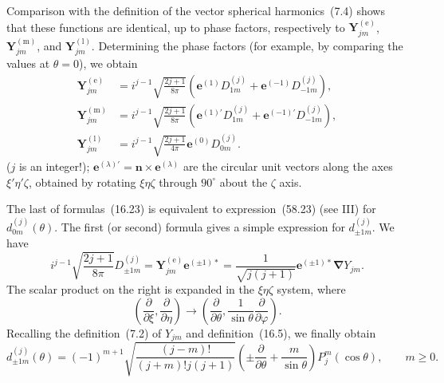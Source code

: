 Comparison with the definition of the vector spherical harmonics~(7.4) shows that these functions are identical, up to phase factors, respectively to $\mathbf Y^{(\text{e})}_{jm}$, $\mathbf Y^{(\text{m})}_{jm}$, and $\mathbf Y^{(\text{l})}_{jm}$. Determining the phase factors (for example, by comparing the values at $\theta=0$), we obtain
\begin{equation}
\begin{aligned}
\mathbf Y^{(\text{e})}_{jm}
&=i^{j-1}\sqrt{\frac{2j+1}{8\pi}}
\left(\mathbf e^{(1)}D^{(j)}_{1m}
+\mathbf e^{(-1)}D^{(j)}_{-1m}\right),\\
\mathbf Y^{(\text{m})}_{jm}
&=i^{j-1}\sqrt{\frac{2j+1}{8\pi}}
\left(\mathbf e^{(1)'}D^{(j)}_{1m}
+\mathbf e^{(-1)'}D^{(j)}_{-1m}\right),\\
\mathbf Y^{(\text{l})}_{jm}
&=i^{j-1}\sqrt{\frac{2j+1}{4\pi}}
\mathbf e^{(0)}D^{(j)}_{0m}.
\end{aligned}
\tag{16.23}
\end{equation}
($j$ is an integer!); $\mathbf e^{(\lambda)'}=\mathbf n\times\mathbf e^{(\lambda)}$ are the circular unit vectors along the axes $\xi'\eta'\zeta$, obtained by rotating $\xi\eta\zeta$ through $90^\circ$ about the $\zeta$ axis.

The last of formulas~(16.23) is equivalent to expression~(58.23) (see III) for $d^{(j)}_{0m}(\theta)$. The first (or second) formula gives a simple expression for $d^{(j)}_{\pm1m}$. We have
\[
i^{j-1}\sqrt{\frac{2j+1}{8\pi}}D^{(j)}_{\pm1m}
=\mathbf Y^{(\text{e})}_{jm}\mathbf e^{(\pm1)*}
=\frac{1}{\sqrt{j(j+1)}}\mathbf e^{(\pm1)*}
\boldsymbol\nabla Y_{jm}.
\]
The scalar product on the right is expanded in the $\xi\eta\zeta$ system, where
\[
\left(\frac{\partial}{\partial\xi},\frac{\partial}{\partial\eta}\right)
\to
\left(\frac{\partial}{\partial\theta},
\frac{1}{\sin\theta}\frac{\partial}{\partial\varphi}\right).
\]
Recalling the definition~(7.2) of $Y_{jm}$ and definition~(16.5), we finally obtain
\begin{equation}
d^{(j)}_{\pm1m}(\theta)
=(-1)^{m+1}\sqrt{\frac{(j-m)!}{(j+m)!j(j+1)}}
\left(\pm\frac{\partial}{\partial\theta}
+\frac{m}{\sin\theta}\right)P_j^m(\cos\theta),
\qquad m\geq0.
\tag{16.24}
\end{equation}
